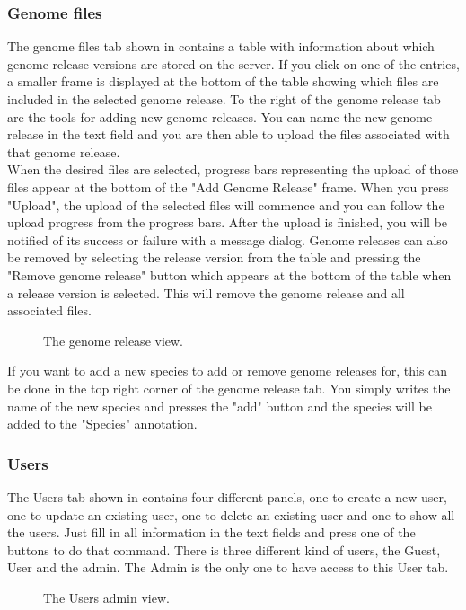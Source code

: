 \subsubsection{Genome files}


The genome files tab shown in  contains a table with information about which genome release versions are stored on the server. If you click on one of the entries, a smaller frame is displayed at the bottom of the table showing which files are included in the selected genome release. To the right of the genome release tab are the tools for adding new genome releases. You can name the new genome release in the text field and you are then able to upload the files associated with that genome release. \\

 When the desired files are selected, progress bars representing the upload of those files appear at the bottom of the "Add Genome Release" frame. When you press "Upload", the upload of the selected files will commence and you can follow the upload progress from the progress bars. After the upload is finished, you will be notified of its success or failure with a message dialog.
Genome releases can also be removed by selecting the release version from the table and pressing the "Remove genome release" button which appears at the bottom of the table when a release version is selected. This will remove the genome release and all associated files.

\begin{figure}[h!]
\caption{The genome release view.}
\label{fig:adm_desktopGenomeTab}
\end{figure}

If you want to add a new species to add or remove genome releases for, this can be done in the top right corner of the genome release tab. You simply writes the name of the new species and presses the "add" button and the species will be added to the "Species" annotation.


\subsubsection{Users}

The Users tab shown in  contains four different panels, one to create a new user, one to update an existing user, one to delete an existing user and one to show all the users. Just fill in all information in the text fields and press one of the buttons to do that command. There is three different kind of users, the Guest, User and the admin. The Admin is the only one to have access to this User tab.


 \begin{figure}[h!]
 \caption{The Users admin view.}
 \label{fig:des_users}
 \end{figure}



